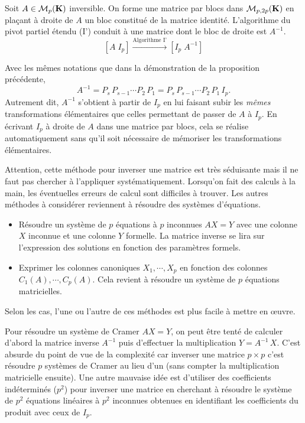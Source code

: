 \begin{prop}
 Soit $A\in \mathcal{M}_p(\mathbf{K})$ inversible. On forme une matrice par blocs dans $\mathcal{M}_{p,2p}(\mathbf{K})$ en plaçant à droite de $A$ un bloc constitué de la matrice identité. L'algorithme du pivot partiel étendu (I') conduit à une matrice dont le bloc de droite est $A^{-1}$.
\begin{displaymath}
\left[ A \; I_p\right] \xrightarrow{\text{Algorithme I'}} \left[ I_p\; A^{-1}\right] 
\end{displaymath}
\end{prop}
\begin{demo}
 Avec les mêmes notations que dans la démonstration de la proposition précédente,
\[
A^{-1} = P_s\,P_{s-1}\cdots P_2 \, P_1 = P_s\,P_{s-1}\cdots P_2 \, P_1\, I_p. 
\]
Autrement dit, $A^{-1}$ s'obtient à partir de $I_p$ en lui faisant subir les \emph{mêmes} transformations élémentaires que celles permettant de passer de $A$ à $I_p$. En écrivant $I_p$ à droite de $A$ dans une matrice par blocs, cela se réalise automatiquement sans qu'il soit nécessaire de mémoriser les transformations élémentaires.
\end{demo}

\begin{rem}
 Attention, cette méthode pour inverser une matrice est très séduisante mais il ne faut pas chercher à l'appliquer systématiquement. Lorsqu'on fait des calculs à la main, les éventuelles erreurs de calcul sont difficiles à trouver.\newline
 Les autres méthodes à considérer reviennent à résoudre des systèmes d'équations.
\begin{itemize}
 \item Résoudre un système de $p$ équations à $p$ inconnues $AX=Y$ avec une colonne $X$ inconnue et une colonne $Y$ formelle. La matrice inverse se lira sur l'expression des solutions en fonction des paramètres formels.
 \item Exprimer les colonnes canoniques $X_1, \cdots, X_p$ en fonction des colonnes $C_1(A), \cdots, C_p(A)$. Cela revient à résoudre un système de $p$ équations matricielles.
\end{itemize}
Selon les cas, l'une ou l'autre de ces méthodes est plus facile à mettre en \oe{}uvre.
\end{rem}
\begin{rems}
Pour résoudre un système de Cramer $AX = Y$, on peut être tenté de calculer d'abord la matrice inverse $A^{-1}$ puis d'effectuer la multiplication $Y = A^{-1}\, X$. C'est absurde du point de vue de la complexité car inverser une matrice $p\times p$ c'est résoudre $p$ systèmes de Cramer au lieu d'un (sans compter la multiplication matricielle ensuite).\newline
Une autre mauvaise idée est d'utiliser des coefficients indéterminés ($p^2$) pour inverser une matrice en cherchant à résoudre le système de $p^2$ équations linéaires à $p^2$ inconnues obtenues en identifiant les coefficients du produit avec ceux de $I_p$. 
\end{rems}


